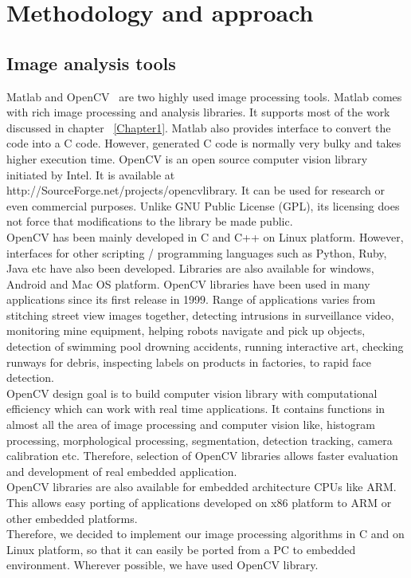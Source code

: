 
\chapter{Methodology and approach} %
\label{Chapter2}

\section{Image analysis tools}
\indent Matlab and OpenCV~\cite{34} are two highly used image processing
tools. Matlab comes with rich image processing and analysis libraries.
It supports most of the work discussed in chapter ~\ref{Chapter1}.
Matlab also provides interface to convert the code into a C code.
However, generated C code is normally very bulky and takes higher
execution time. OpenCV is an open source computer vision library
initiated by Intel. It is available at
http://SourceForge.net/projects/opencvlibrary. It can be used for
research or even commercial purposes. Unlike GNU Public License (GPL),
its licensing does not force that modifications to the library be made
public. \\
\indent OpenCV has been mainly developed in C and C++ on Linux platform.
However, interfaces for other scripting / programming languages such as
Python, Ruby, Java etc have also been developed. Libraries are also
available for windows, Android and Mac OS platform. OpenCV libraries
have been used in many applications since its first release in 1999.
Range of applications varies from stitching street view images together,
detecting intrusions in surveillance video, monitoring mine equipment,
helping robots navigate and pick up objects, detection of swimming pool
drowning accidents, running interactive art, checking runways for
debris, inspecting labels on products in factories, to rapid face
detection.\\
\indent OpenCV design goal is to build computer vision library with
computational efficiency which can work with real time applications. It
contains functions in almost all the area of image processing and
computer vision like, histogram processing, morphological processing,
segmentation, detection tracking, camera calibration etc. Therefore,
selection of OpenCV libraries allows faster evaluation and development
of real embedded application.\\
\indent OpenCV libraries are also available for embedded architecture
CPUs like ARM. This allows easy porting of applications developed on x86
platform to ARM or other embedded platforms.\\
\indent Therefore, we decided to implement our image processing
algorithms in C and on Linux platform, so that it can easily be ported
from a PC to embedded environment. Wherever possible, we have used
OpenCV library.
